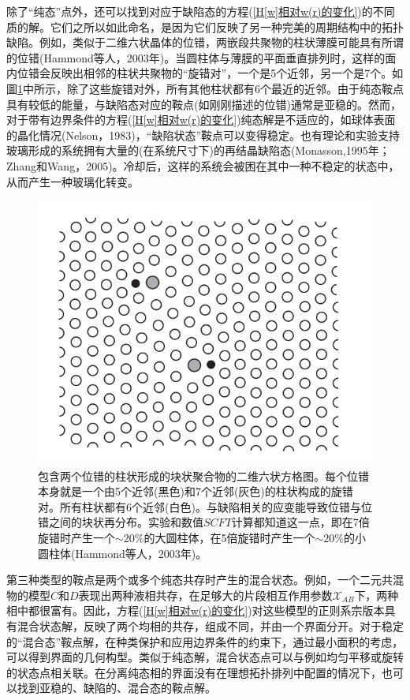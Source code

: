 除了“纯态”点外，还可以找到对应于缺陷态的方程(\ref{H[w]相对w(r)的变化})的不同质的解。它们之所以如此命名，是因为它们反映了另一种完美的周期结构中的拓扑缺陷。例如，类似于二维六状晶体的位错，两嵌段共聚物的柱状薄膜可能具有所谓的位错(Hammond等人，2003年)。当圆柱体与薄膜的平面垂直排列时，这样的面内位错会反映出相邻的柱状共聚物的“旋错对”，一个是5个近邻，另一个是7个。如圖\ref{方格图}中所示，除了这些旋错对外，所有其他柱状都有6个最近的近邻。由于纯态鞍点具有较低的能量，与缺陷态对应的鞍点(如刚刚描述的位错)通常是亚稳的。然而，对于带有边界条件的方程(\ref{H[w]相对w(r)的变化})纯态解是不适应的，如球体表面的晶化情况(Nelson，1983)，“缺陷状态”鞍点可以变得稳定。也有理论和实验支持玻璃形成的系统拥有大量的(在系统尺寸下)的再结晶缺陷态(Monasson,1995年；Zhang和Wang，2005)。冷却后，这样的系统会被困在其中一种不稳定的状态中，从而产生一种玻璃化转变。\\
\begin{figure}[H]
        \centering
         \includegraphics[width=12cm]{./figures/3.png}
    \caption{包含两个位错的柱状形成的块状聚合物的二维六状方格图。每个位错本身就是一个由5个近邻(黑色)和7个近邻(灰色)的柱状构成的旋错对。所有柱状都有6个近邻(白色)。与缺陷相关的应变能导致位错与位错之间的块状再分布。实验和数值$SCFT$计算都知道这一点，即在7倍旋错时产生一个$\sim 20\%$的大圆柱体，在5倍旋错时产生一个$\sim 20\%$的小圆柱体(Hammond等人，2003年)。} 
           \label{方格图}
\end{figure}


第三种类型的鞍点是两个或多个纯态共存时产生的混合状态。例如，一个二元共混物的模型$C$和$D$表现出两种液相共存，在足够大的片段相互作用参数$\mathcal{X}_{AB}$下，两种相中都很富有。因此，方程(\ref{H[w]相对w(r)的变化})对这些模型的正则系宗版本具有混合状态解，反映了两个均相的共存，组成不同，并由一个界面分开。对于稳定的“混合态”鞍点解，在种类保护和应用边界条件的约束下，通过最小面积的考虑，可以得到界面的几何构型。类似于纯态解，混合状态点可以与例如均匀平移或旋转的状态点相关联。在分离纯态相的界面没有在理想拓扑排列中配置的情况下，也可以找到亚稳的、缺陷的、混合态的鞍点解。\\

